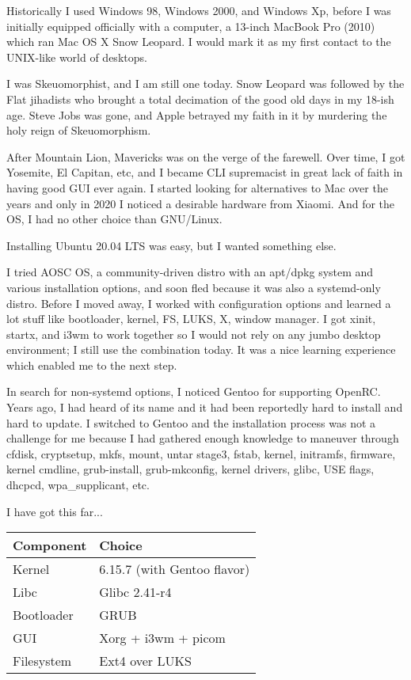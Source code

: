 
Historically I used Windows 98, Windows 2000, and Windows Xp,
before I was initially equipped officially with a computer,
a 13-inch MacBook Pro (2010) which ran Mac OS X Snow Leopard.
I would mark it as my first contact to the UNIX-like world of desktops.

I was Skeuomorphist, and I am still one today.
Snow Leopard was followed by the Flat jihadists who brought a total decimation of the good old days in my 18-ish age.
Steve Jobs was gone, and Apple betrayed my faith in it by murdering the holy reign of Skeuomorphism.

After Mountain Lion, Mavericks was on the verge of the farewell.
Over time, I got Yosemite, El Capitan, etc, and I became CLI supremacist in great lack of faith in having good GUI ever again.
I started looking for alternatives to Mac over the years and only in 2020 I noticed a desirable hardware from Xiaomi.
And for the OS, I had no other choice than GNU/Linux.

Installing Ubuntu 20.04 LTS was easy, but I wanted something else.

I tried AOSC OS, a community-driven distro with an apt/dpkg system and various installation options, and soon fled because it was also a systemd-only distro.
Before I moved away, I worked with configuration options and learned a lot stuff like bootloader, kernel, FS, LUKS, X, window manager.
I got xinit, startx, and i3wm to work together so I would not rely on any jumbo desktop environment; I still use the combination today.
It was a nice learning experience which enabled me to the next step.

In search for non-systemd options, I noticed Gentoo for supporting OpenRC.
Years ago, I had heard of its name and it had been reportedly hard to install and hard to update.
I switched to Gentoo and the installation process was not a challenge for me because I had gathered enough knowledge to maneuver through
cfdisk, cryptsetup, mkfs, mount, untar stage3, fstab, kernel, initramfs, firmware, kernel cmdline, grub-install, grub-mkconfig, kernel drivers,
glibc, USE flags, dhcpcd, wpa\_supplicant, etc.

I have got this far...

\begin{tabu}{XX[2]}
	\toprule
	Component  & Choice                      \\
	\midrule
	Kernel     & 6.15.7 (with Gentoo flavor) \\
	Libc       & Glibc 2.41-r4               \\
	Bootloader & GRUB                        \\
	GUI        & Xorg + i3wm + picom         \\
	Filesystem & Ext4 over LUKS              \\
	\bottomrule
\end{tabu}


